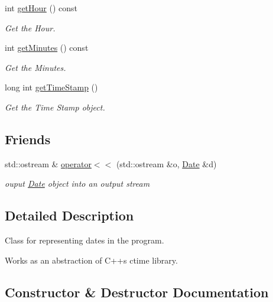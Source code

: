 \begin{DoxyCompactItemize}
int \mbox{\hyperlink{classDate_ab8ea9e1aafa6cb95be7b82cda0c53cfe}{get\+Hour}} () const
\begin{DoxyCompactList}\small\item\em Get the Hour. \end{DoxyCompactList}\item 
int \mbox{\hyperlink{classDate_a55251df891f43b9f19419cd79ce69876}{get\+Minutes}} () const
\begin{DoxyCompactList}\small\item\em Get the Minutes. \end{DoxyCompactList}\item 
long int \mbox{\hyperlink{classDate_af047ef9ca2cf7843b921f36e9883f0a7}{get\+Time\+Stamp}} ()
\begin{DoxyCompactList}\small\item\em Get the Time Stamp object. \end{DoxyCompactList}\end{DoxyCompactItemize}
\subsection*{Friends}
\begin{DoxyCompactItemize}
\item 
std\+::ostream \& \mbox{\hyperlink{classDate_a2f114c7aa1398dac0f21b888bcb40f3e}{operator$<$$<$}} (std\+::ostream \&o, \mbox{\hyperlink{classDate}{Date}} \&d)
\begin{DoxyCompactList}\small\item\em ouput \mbox{\hyperlink{classDate}{Date}} object into an output stream \end{DoxyCompactList}\end{DoxyCompactItemize}


\subsection{Detailed Description}
Class for representing dates in the program. 

Works as an abstraction of C++\textquotesingle{}s ctime library. 

\subsection{Constructor \& Destructor Documentation}
\mbox{\label{classDate_aa29ee0f04162437b91b758be0a4b75fc}} 
